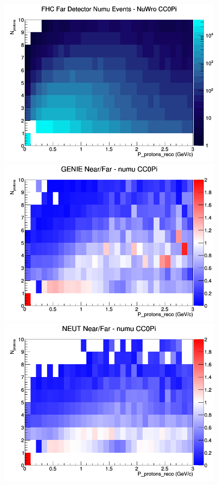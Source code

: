 \begin{figure}[h]
\endminipage
{}
\includegraphics[width=\linewidth]{eff_N_P/FGT/protons/CC0Pi_FHC_FD_numu_N_P_NuWro.png}
\endminipage
\newline
{}
\includegraphics[width=\linewidth]{eff_N_P/FGT/protons/ratios/CC0Pi_GENIE_numu_NF_N_P.png}
\endminipage
{}
\includegraphics[width=\linewidth]{eff_N_P/FGT/protons/ratios/CC0Pi_NEUT_numu_NF_N_P.png}

\end{figure}
